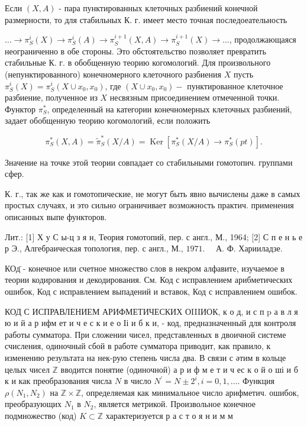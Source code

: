 \documentclass[10pt]{article}
\begin{document}
Если $(X, A)$ - пара пунктированных клеточных разбиений конечной размерности, то для стабильных К. г. имеет место точная последоеательность



$\ldots \rightarrow \pi_{S}^{i}(X) \rightarrow \pi_{S}^{i}(A) \rightarrow \pi_{S}^{i+1}(X, A) \rightarrow \pi_{S}^{i+1}(X) \rightarrow \ldots$, продолжающаяся неограниченно в обе стороны. Это обстоятельство позволяет превратить стабильные К. г. в обобщенную теорию когомологий. Для произвольного (непунктированного) конечномерного клеточного разбиения $X$ пусть $\pi_{S}^{i}(X)=\pi_{S}^{i}\left(X \cup x_{0}, x_{0}\right)$, где $\left(X \cup x_{0}, x_{0}\right)-$ пунктированное клеточное разбиение, полученное из $X$ несвязным присоединением отмеченной точки. Функтор $\pi_{S}^{*}$, определенный на категории конечномерных клеточных разбиений, задает обобщенную теорию когомологий, если положить



\[

\pi_{S}^{*}(X, A)=\tilde{\pi}_{S}^{*}(X / A)=\operatorname{Ker}\left[\pi_{S}^{*}(X / A) \rightarrow \pi_{S}^{*}(p t)\right] .

\]



Значение на точке этой теории совпадает со стабильными гомотопич. группами сфер.



К. г., так же как и гомотопические, не могут быть явно вычислены даже в самых простых случаях, и это сильно ограничивает возможность практич. применения описанных выпе функторов.



Лит.: [1] Х у С ы-ц з я н, Теория гомотопий, пер. с англ., М., 1964; [2] С п е н ь е р Э., Алгебраическая топология, пер. с англ., М., $1971 . \quad$ А. Ф. Харииладзе.



КОд̈ - конечное или счетное множество слов в некром алфавите, изучаемое в теории кодирования и декодирования. См. Код с исправлением арибметических ошибок, Код с исправлением выпадений и вставок, Код с исправлением ошибок.



КОД С ИСПРАВЛЕНИЕМ АРИФМЕТИЧЕСКИХ ОIIIИОК, к о д, и с п $\mathrm{p}$ а в л я ю и й а р ифм ет и ч е с к и е о Іі и б к и, - код, предназначенный для контроля работы сумматора. При сложении чисел, представленных в двоичной системе счисления, одиночный сбой в работе сумматора приводит, как правило, к изменению результата на нек-рую степень числа два. В связи с әтим в кольце целых чисел $\mathbb{Z}$ вводится понятие (одиночной) а р и ф м е т и ч ес к о й о ші и б к и как преобразования числа $N$ в число $N^{\prime}=N \pm 2^{i}, i=0,1, \ldots$. Функция $\rho\left(N_{1}, N_{2}\right)$ на $\mathbb{Z} \times \mathbb{Z}$, определяемая как минимальное число арифметич. ошибок, преобразующих $N_{1}$ в $N_{2}$, является метрикой. Произвольное конечное подмножество (код) $K \subset \mathbb{Z}$ характеризуется р а с т о я н и м м
\end{document}
